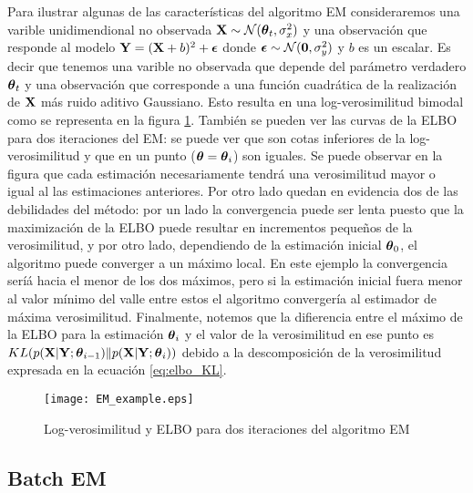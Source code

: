 Para ilustrar algunas de las características del algoritmo EM consideraremos una varible unidimendional no observada $\mathbf{X} \sim \mathcal{N}(\mbox{\boldmath$ \theta $}_t, \sigma_x^2)$ y una observación que responde al modelo $\mathbf{Y} = (\mathbf{X} + b)^2 + \mbox{\boldmath$ \epsilon $}$ donde $\mbox{\boldmath$ \epsilon $} \sim \mathcal{N}(\mathbf{0}, \sigma_y^2)$ y $b$ es un escalar. Es decir que tenemos una varible no observada que depende del parámetro verdadero $\mbox{\boldmath$ \theta $}_t$ y una observación que corresponde a una función cuadrática de la realización de $\mathbf{X}$ más ruido aditivo Gaussiano. Esto resulta en una log-verosimilitud bimodal como se representa en la figura \ref{fig:EM_example}. También se pueden ver las curvas de la ELBO para dos iteraciones del EM: se puede ver que son cotas inferiores de la log-verosimilitud y que en un punto ($\mbox{\boldmath$ \theta $} = \mbox{\boldmath$ \theta $}_i$) son iguales. Se puede observar en la figura que cada estimación necesariamente tendrá una verosimilitud mayor o igual al las estimaciones anteriores. Por otro lado quedan en evidencia dos de las debilidades del método: por un lado la convergencia puede ser lenta  puesto que la maximización de la ELBO puede resultar en incrementos pequeños de la verosimilitud, y por otro lado, dependiendo de la estimación inicial $\mbox{\boldmath$ \theta $}_0$, el algoritmo puede converger a un máximo local. En este ejemplo la convergencia seríá hacia el menor de los dos máximos, pero si la estimación inicial fuera menor al valor mínimo del valle entre estos el algoritmo convergería al estimador de máxima verosimilitud. Finalmente, notemos que la difierencia entre el máximo de la ELBO para la estimación $\mbox{\boldmath$ \theta $}_i$ y el valor de la verosimilitud en ese punto es $KL(p(\mathbf{X} | \mathbf{Y}; \mbox{\boldmath$ \theta $}_{i-1}) \rVert p(\mathbf{X} | \mathbf{Y}; \mbox{\boldmath$ \theta $}_{i}))$ debido a la descomposición de la verosimilitud expresada en la ecuación \ref{eq:elbo_KL}.

\begin{figure}[h]
    \centering
    \texttt{[image: EM\_example.eps]}
    \caption{Log-verosimilitud y ELBO para dos iteraciones del algoritmo EM}
    \label{fig:EM_example}
\end{figure}

\subsection{Batch EM} \label{sec:batchEM}

